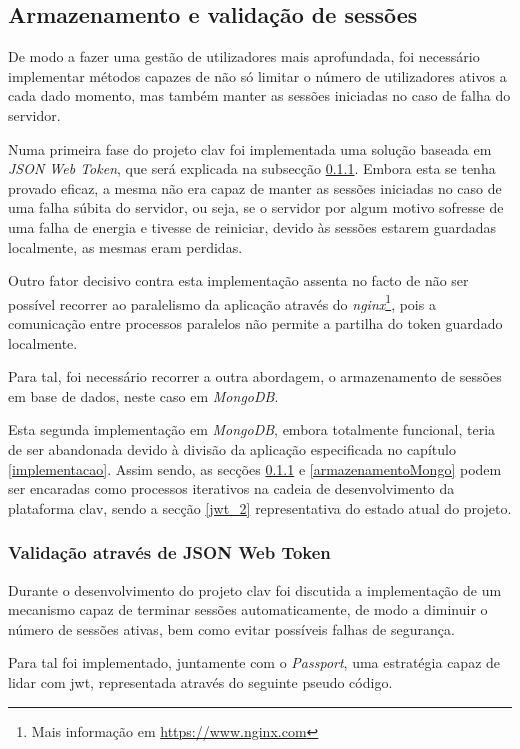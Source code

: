 \cleardoublepage
\subsection{Armazenamento e validação de sessões}

De modo a fazer uma gestão de utilizadores mais aprofundada, foi necessário implementar métodos capazes de não só limitar o número de utilizadores ativos a cada dado momento, mas também manter as sessões iniciadas no caso de falha do servidor.

Numa primeira fase do projeto \gls{clav} foi implementada uma solução baseada em \emph{JSON Web Token}, que será explicada na subsecção \ref{jwt_1}. Embora esta se tenha provado eficaz, a mesma não era capaz de manter as sessões iniciadas no caso de uma falha súbita do servidor, ou seja, se o servidor por algum motivo sofresse de uma falha de energia e tivesse de reiniciar, devido às sessões estarem guardadas localmente, as mesmas eram perdidas.

Outro fator decisivo contra esta implementação assenta no facto de não ser possível recorrer ao paralelismo da aplicação através do \emph{nginx}\footnote{Mais informação em \url{https://www.nginx.com}}, pois a comunicação entre processos paralelos não permite a partilha do token guardado localmente.

Para tal, foi necessário recorrer a outra abordagem, o armazenamento de sessões em base de dados, neste caso em \emph{MongoDB}.

Esta segunda implementação em \emph{MongoDB}, embora totalmente funcional, teria de ser abandonada devido à divisão da aplicação especificada no capítulo \ref{implementacao}. Assim sendo, as secções \ref{jwt_1} e \ref{armazenamentoMongo} podem ser encaradas como processos iterativos na cadeia de desenvolvimento da plataforma \gls{clav}, sendo a secção \ref{jwt_2} representativa do estado atual do projeto.

\subsubsection{Validação através de JSON Web Token} \label{jwt_1}

Durante o desenvolvimento do projeto \gls{clav} foi discutida a implementação de um mecanismo capaz de terminar sessões automaticamente, de modo a diminuir o número de sessões ativas, bem como evitar possíveis falhas de segurança.

Para tal foi implementado, juntamente com o \emph{Passport}, uma estratégia capaz de lidar com \gls{jwt}, representada através do seguinte pseudo código.

